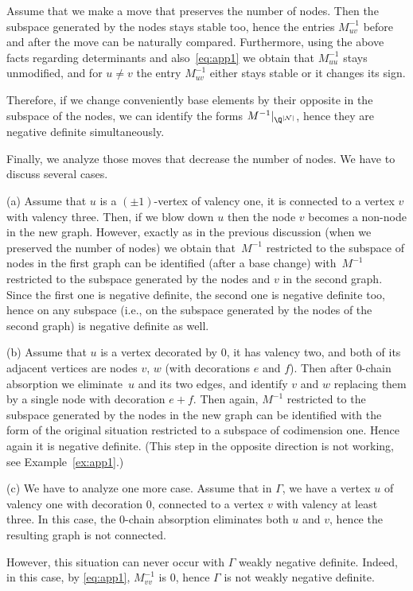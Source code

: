 \documentclass[pdftex]{sigma}
\begin{document}
Assume that we make a move that preserves the number of nodes. Then the subspace generated by the nodes stays stable too, hence the entries $M^{-1}_{uv}$ before and after the move can be naturally compared. Furthermore, using the above facts regarding determinants and also~\eqref{eq:app1} we obtain that $M^{-1}_{uu}$ stays unmodified, and
for $u\not=v$ the entry $M^{-1}_{uv}$ either stays stable or it changes its sign.

Therefore, if we change conveniently base elements by their opposite in the subspace of the nodes, we can identify the forms $M^{-1}|_{\Q^{|\mathcal{N}|}}$, hence they are negative definite simultaneously.

Finally, we analyze those moves that decrease the number of nodes. We have to discuss several cases.

(a) Assume that $u$ is a $(\pm 1)$-vertex of valency one, it is connected to a vertex $v$
with valency three. Then, if we blow down $u$ then the node $v$ becomes a non-node in the new graph. However, exactly as in the previous discussion (when we preserved the number of nodes) we obtain that~$M^{-1}$ restricted to the
subspace of nodes in the first graph can be identified (after a base change)
with~$M^{-1}$ restricted to the
subspace generated by the nodes and $v$ in the second graph.
Since the first one is negative definite, the second one is negative definite too,
hence on any subspace (i.e., on the subspace generated by the nodes of the second graph) is negative definite as well.

(b)
Assume that $u$ is a vertex decorated by 0, it has valency two, and both of its
adjacent vertices are nodes $v$, $w$ (with decorations $e$ and $f$).
Then after 0-chain absorption we eliminate~$u$ and its two edges, and identify
$v$ and $w$ replacing them by a single node with decoration $e+f$.
Then again, $M^{-1}$ restricted to the
subspace generated by the nodes in the new graph can be identified with
the form of the original situation restricted to a subspace of codimension one.
Hence again it is negative definite. (This step in the opposite direction is not working, see Example~\ref{ex:app1}.)

(c) We have to analyze one more case.
Assume that in $\Gamma$, we have a vertex $u$ of valency one with decoration $0$, connected to a vertex $v$
with valency at least three. In this case, the 0-chain absorption eliminates both $u$ and $v$, hence the resulting graph is not connected.

However, this situation can never occur with $\Gamma$ weakly negative definite.
Indeed, in this case, by \eqref{eq:app1}, $M^{-1}_{vv}$ is 0, hence
$\Gamma$ is not weakly negative definite.
\end{document}
